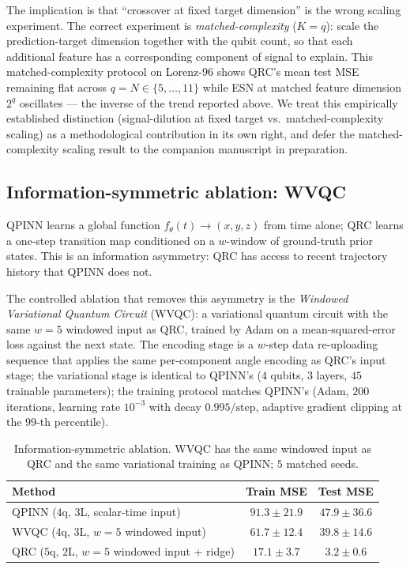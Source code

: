 \documentclass[11pt,a4paper]{article}
\begin{document}
The implication is that ``crossover at fixed target dimension'' is
the wrong scaling experiment. The correct experiment is
\emph{matched-complexity} ($K = q$): scale the prediction-target
dimension together with the qubit count, so that each additional
feature has a corresponding component of signal to explain. This
matched-complexity protocol on Lorenz-$96$ shows QRC's mean test
MSE remaining flat across $q = N \in \{5, \dots, 11\}$ while ESN at
matched feature dimension $2^q$ oscillates --- the inverse of the
trend reported above. We treat this empirically established
distinction (signal-dilution at fixed target vs.\ matched-complexity
scaling) as a methodological contribution in its own right, and
defer the matched-complexity scaling result to the companion
manuscript in preparation.

\subsection{Information-symmetric ablation: WVQC}
\label{ssec:wvqc}

QPINN learns a global function $f_\theta(t) \to (x, y, z)$ from time
alone; QRC learns a one-step transition map conditioned on a
$w$-window of ground-truth prior states. This is an information
asymmetry: QRC has access to recent trajectory history that QPINN
does not.

The controlled ablation that removes this asymmetry is the
\emph{Windowed Variational Quantum Circuit} (WVQC): a variational
quantum circuit with the same $w = 5$ windowed input as QRC,
trained by Adam on a mean-squared-error loss against the next state.
The encoding stage is a $w$-step data re-uploading sequence that
applies the same per-component angle encoding as QRC's input stage;
the variational stage is identical to QPINN's ($4$ qubits, $3$
layers, $45$ trainable parameters); the training protocol matches
QPINN's (Adam, $200$ iterations, learning rate $10^{-3}$ with decay
$0.995/\mathrm{step}$, adaptive gradient clipping at the $99$-th
percentile).

\begin{table}[h]
    \centering
    \caption{Information-symmetric ablation. WVQC has the same
      windowed input as QRC and the same variational training as
      QPINN; $5$ matched seeds.}
    \label{tab:wvqc}
    \begin{tabular}{lcc}
        \toprule
        \textbf{Method} & \textbf{Train MSE} & \textbf{Test MSE} \\
        \midrule
        QPINN ($4$q, $3$L, scalar-time input) & $91.3 \pm 21.9$ & $47.9 \pm 36.6$ \\
        WVQC  ($4$q, $3$L, $w=5$ windowed input) & $61.7 \pm 12.4$ & $39.8 \pm 14.6$ \\
        QRC   ($5$q, $2$L, $w=5$ windowed input + ridge) & $\mathbf{17.1 \pm 3.7}$ & $\mathbf{3.2 \pm 0.6}$ \\
        \bottomrule
    \end{tabular}
\end{table}
\end{document}
